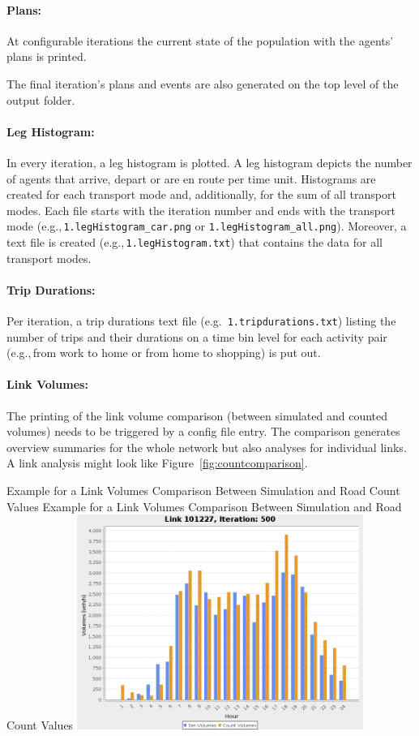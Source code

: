 \paragraph{Plans:} At configurable iterations the current state of the population with the agents' plans is printed.

The final iteration's plans and events are also generated on the top level of the output folder.

\paragraph{Leg Histogram:}
In every iteration, a leg histogram is plotted. A leg histogram depicts the number of agents that arrive, depart or are en route per time unit. Histograms are created for each transport mode and, additionally, for the sum of all transport modes. Each file starts with the iteration number and ends with the transport mode (e.g.,\,\lstinline|1.legHistogram_car.png| or \lstinline|1.legHistogram_all.png|). Moreover, a text file is created (e.g.,\,\lstinline|1.legHistogram.txt|) that contains the data for all transport modes.

\paragraph{Trip Durations:}
Per iteration, a \gls{trip} durations text file (e.g.\ \lstinline|1.tripdurations.txt|) listing the number of trips and their durations on a time bin level for each activity pair (e.g.,\,from work to home or from home to shopping) is put out.

\paragraph{Link Volumes:}
The printing of the link volume comparison (between simulated and counted volumes) needs to be triggered by a config file entry. The comparison generates overview summaries for the whole network but also analyses for individual links. A link analysis might look like Figure~\ref{fig:countcomparison}.

\createfigure%
{Example for a Link Volumes Comparison Between Simulation and Road Count Values}%
{Example for a Link Volumes Comparison Between Simulation and Road Count Values}%
{\label{fig:countcomparison}}%
{\includegraphics[width=0.7\textwidth, angle=0]{using/figures/link101227.png}}%
{}

